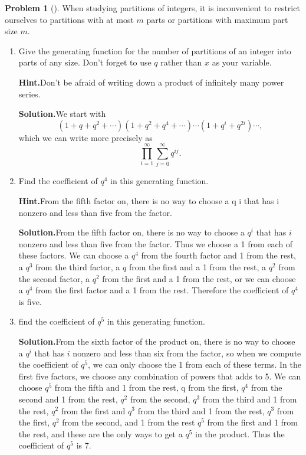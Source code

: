 \documentclass[10pt,]{book}
\theoremstyle{plain}
\theoremstyle{definition}
\newtheorem{activity}[project]{Problem}
\theoremstyle{definition}
\numberwithin{equation}{chapter}
\begin{document}
\begin{activity}[]\label{genfunpartitions}
When studying partitions of integers, it is inconvenient to restrict ourselves to partitions with at most \(m\) parts or partitions with maximum part size \(m\).%
\begin{enumerate}[font=\bfseries,label=(\alph*),ref=\alph*]
\item\label{task-137} Give the generating function for the number of partitions of an integer into parts of any size. Don't forget to use \(q\) rather than \(x\) as your variable.%
\par\medskip\noindent%
\textbf{Hint.}\quad Don't be afraid of writing down a product of infinitely many power series.%
\par\medskip\noindent%
\textbf{Solution.}\quad We start with%
\begin{equation*}
(1+q+q^2+\cdots)(1+q^2+q^4+\cdots)\cdots(1+q^i+q^{2i})\cdots,
\end{equation*}
which we can write more precisely as%
\begin{equation*}
\prod_{i=1}^\infty \sum_{j=0}^\infty q^{ij}.
\end{equation*}
%
\item\label{task-138} Find the coefficient of \(q^4\) in this generating function.%
\par\medskip\noindent%
\textbf{Hint.}\quad From the fifth factor on, there is no way to choose a q i that has i nonzero and less than five from the factor.%
\par\medskip\noindent%
\textbf{Solution.}\quad From the fifth factor on, there is no way to choose a \(q^i\) that has \(i\) nonzero and less than five from the factor. Thus we choose a 1 from each of these factors. We can choose a \(q^4\) from the fourth factor and 1 from the rest, a \(q^3\) from the third factor, a \(q\) from the first and a 1 from the rest, a \(q^2\) from the second factor, a \(q^2\) from the first and a 1 from the rest, or we can choose a \(q^4\) from the first factor and a 1 from the rest. Therefore the coefficient of \(q^4\) is five.%
\item\label{task-139} find the coefficient of \(q^5\) in this generating function.%
\par\medskip\noindent%
\textbf{Solution.}\quad From the sixth factor of the product on, there is no way to choose a \(q^i\) that has \(i\) nonzero and less than six from the factor, so when we compute the coefficient of \(q^5\), we can only choose the 1 from each of these terms. In the first five factors, we choose any combination of powers that adds to 5. We can choose \(q^5\) from the fifth and 1 from the rest, q from the first, \(q^4\) from the second and 1 from the rest, \(q^2\) from the second, \(q^3\) from the third and 1 from the rest, \(q^2\) from the first and \(q^3\) from the third and 1 from the rest, \(q^3\) from the first, \(q^2\) from the second, and 1 from the rest \(q^5\) from the first and 1 from the rest, and these are the only ways to get a \(q^5\) in the product. Thus the coefficient of \(q^5\) is 7.%

\end{enumerate}
\end{activity}
\end{document}
